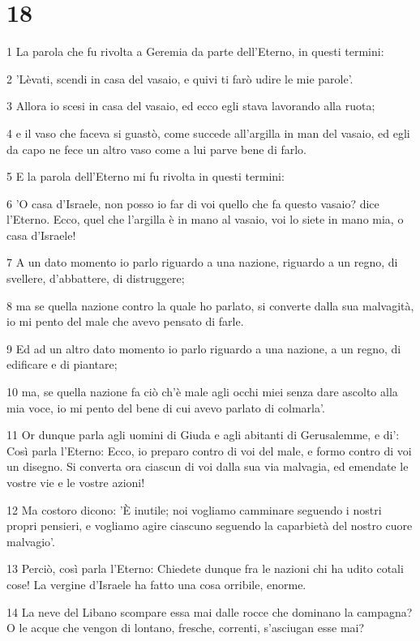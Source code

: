 \chapter{18}

\par 1 La parola che fu rivolta a Geremia da parte dell'Eterno, in questi termini:
\par 2 'Lèvati, scendi in casa del vasaio, e quivi ti farò udire le mie parole'.
\par 3 Allora io scesi in casa del vasaio, ed ecco egli stava lavorando alla ruota;
\par 4 e il vaso che faceva si guastò, come succede all'argilla in man del vasaio, ed egli da capo ne fece un altro vaso come a lui parve bene di farlo.
\par 5 E la parola dell'Eterno mi fu rivolta in questi termini:
\par 6 'O casa d'Israele, non posso io far di voi quello che fa questo vasaio? dice l'Eterno. Ecco, quel che l'argilla è in mano al vasaio, voi lo siete in mano mia, o casa d'Israele!
\par 7 A un dato momento io parlo riguardo a una nazione, riguardo a un regno, di svellere, d'abbattere, di distruggere;
\par 8 ma se quella nazione contro la quale ho parlato, si converte dalla sua malvagità, io mi pento del male che avevo pensato di farle.
\par 9 Ed ad un altro dato momento io parlo riguardo a una nazione, a un regno, di edificare e di piantare;
\par 10 ma, se quella nazione fa ciò ch'è male agli occhi miei senza dare ascolto alla mia voce, io mi pento del bene di cui avevo parlato di colmarla'.
\par 11 Or dunque parla agli uomini di Giuda e agli abitanti di Gerusalemme, e di': Così parla l'Eterno: Ecco, io preparo contro di voi del male, e formo contro di voi un disegno. Si converta ora ciascun di voi dalla sua via malvagia, ed emendate le vostre vie e le vostre azioni!
\par 12 Ma costoro dicono: 'È inutile; noi vogliamo camminare seguendo i nostri propri pensieri, e vogliamo agire ciascuno seguendo la caparbietà del nostro cuore malvagio'.
\par 13 Perciò, così parla l'Eterno: Chiedete dunque fra le nazioni chi ha udito cotali cose! La vergine d'Israele ha fatto una cosa orribile, enorme.
\par 14 La neve del Libano scompare essa mai dalle rocce che dominano la campagna? O le acque che vengon di lontano, fresche, correnti, s'asciugan esse mai?
